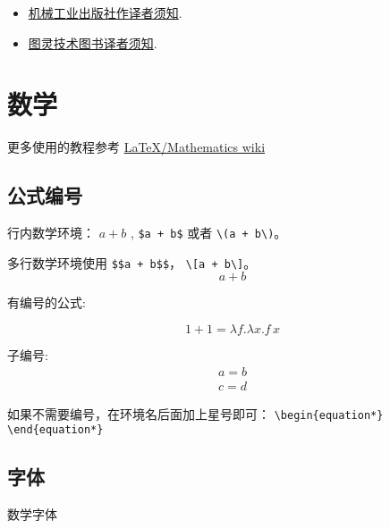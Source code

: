 \begin{itemize}
\item \href{http://www.cmpbook.com/index.php?id=131}{机械工业出版社作译者须知}.
\item \href{http://www.ituring.com.cn/article/501527}{图灵技术图书译者须知}.
\end{itemize}

\section{数学}

更多使用的教程参考 \href{https://en.wikibooks.org/wiki/LaTeX/Mathematics}{\LaTeX/Mathematics wiki}

\subsection{公式编号}

行内数学环境： $a + b$ , \verb!$a + b$! 或者 \verb!\(a + b\)!。

多行数学环境使用 \verb!$$a + b$$!，  \verb!\[a + b\]!。
$$a + b$$

有编号的公式:

\begin{equation}\label{euqation:one_plus_one}
    1 + 1 = \lambda f . \lambda x . f\, x
\end{equation}


子编号:
\begin{subequations}
    \begin{eqnarray}
        a = b \\
        c = d
    \end{eqnarray}
\end{subequations}

如果不需要编号，在环境名后面加上星号即可： \verb!\begin{equation*} \end{equation*}!

\subsection{字体}

数学字体

